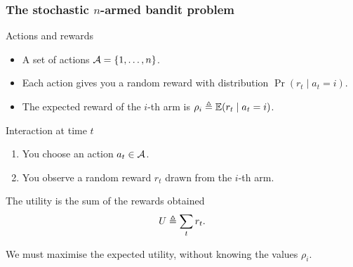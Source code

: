 \documentclass[9pt]{beamer}
\begin{document}
\begin{frame}  
  \frametitle{The stochastic $n$-armed bandit problem}
  \begin{block}{Actions and rewards}
    \begin{itemize}
    \item A set of \alert{actions} ${\mathcal{A}} = \left\{1, \ldots, n\right\}$.
    \item Each action gives you a \alert{random reward} with distribution $\Pr(r_t \mid a_t = i)$.
    \item The  \alert{expected reward} of the $i$-th arm is $\rho_i \mathrel{\triangleq} \mathop{\mbox{\ensuremath{\mathbb{E}}}}\nolimits(r_t \mid a_t = i)$.
    \end{itemize}
  \end{block}
  \begin{exampleblock}{Interaction at time $t$}
    \begin{enumerate}
    \item You choose an action $a_t \in {\mathcal{A}}$.
    \item You observe a random reward $r_t$ drawn from the $i$-th arm.
    \end{enumerate}
  \end{exampleblock}
  \begin{block}{The utility is the \alert{sum of the rewards} obtained}
    \[
      U \mathrel{\triangleq} \sum_{t} r_t.
    \]
  \end{block}
  We must maximise the expected utility, \alert{without knowing} the values $\rho_i$.
\end{frame}
\end{document}
